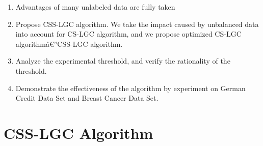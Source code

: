 \documentclass{svjour3}                     %
\begin{document}
\begin{enumerate}[(1)]
  \item Advantages of many unlabeled data are fully taken
  \item Propose CSS-LGC algorithm. We take the impact caused by unbalanced data into account for CS-LGC algorithm, and we propose optimized CS-LGC algorithmâ€”CSS-LGC algorithm.
  \item Analyze the experimental threshold, and verify the rationality of the threshold. 
  \item Demonstrate the effectiveness of the algorithm by experiment on German Credit Data Set and Breast Cancer Data Set.
\end{enumerate}

\section{CSS-LGC Algorithm}
\end{document}
